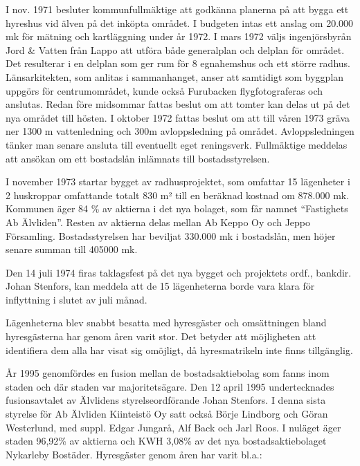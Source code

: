 I nov. 1971 besluter kommunfullmäktige att godkänna planerna på att bygga ett hyreshus vid älven på det inköpta området. I budgeten intas ett anslag om 20.000 mk för mätning och kartläggning under år 1972. I mars 1972 väljs ingenjörsbyrån Jord \& Vatten från Lappo att utföra både generalplan och delplan för området. Det resulterar i en delplan som ger rum för 8 egnahemshus och ett större radhus. Länsarkitekten, som anlitas i sammanhanget, anser att samtidigt som byggplan uppgörs för centrumområdet, kunde också Furubacken flygfotograferas och anslutas. Redan före midsommar fattas beslut om att tomter kan delas ut på det nya området till hösten. I oktober 1972 fattas beslut om att till våren 1973 gräva ner 1300 m vattenledning och 300m avloppsledning på området. Avloppsledningen tänker man senare ansluta till eventuellt eget reningsverk. Fullmäktige meddelas att ansökan om ett bostadslån inlämnats till bostadsstyrelsen.

I november 1973 startar bygget av radhusprojektet, som omfattar 15 lägenheter i 2 huskroppar omfattande totalt 830 m² till en beräknad kostnad om 878.000 mk. Kommunen äger 84 \% av aktierna i det nya bolaget, som får namnet ``Fastighets Ab Älvliden''. Resten av aktierna delas mellan Ab Keppo Oy och Jeppo Församling. Bostadsstyrelsen har beviljat 330.000 mk i bostadslån, men höjer senare summan till 405000 mk.

Den 14 juli 1974 firas taklagsfest på det nya bygget och projektets ordf., bankdir. Johan Stenfors, kan meddela att de 15 lägenheterna borde vara klara för inflyttning i slutet av juli månad.

Lägenheterna blev snabbt besatta med hyresgäster och omsättningen bland hyresgästerna har genom åren varit stor. Det betyder att möjligheten att identifiera dem alla har visat sig omöjligt, då hyresmatrikeln inte finns tillgänglig.

År 1995 genomfördes en fusion mellan de bostadsaktiebolag som fanns inom staden och där staden var majoritetsägare. Den 12 april 1995 undertecknades fusionsavtalet av Älvlidens styrelseordförande Johan Stenfors. I denna sista styrelse för Ab Älvliden Kiinteistö Oy satt också Börje Lindborg och Göran Westerlund, med suppl. Edgar Jungarå, Alf Back och Jarl Roos. I nuläget äger staden 96,92\% av aktierna och KWH 3,08\% av det nya bostadsaktiebolaget Nykarleby Bostäder.
Hyresgäster genom åren har varit bl.a.:


